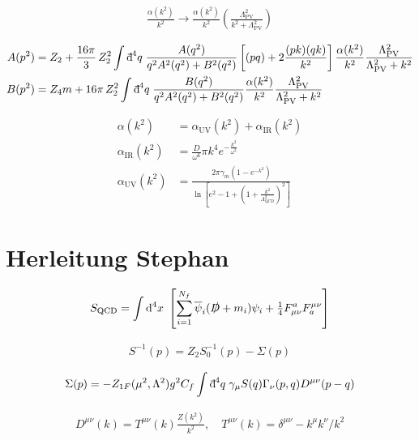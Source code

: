 \documentclass[oneside, openany]{book}
\numberwithin{equation}{chapter}
\numberwithin{figure}{chapter}
\newcommand{\dbar}{\mathord{\mathrm{d}\mkern-8mu\raisebox{0.55em}{\rule{0.38em}{0.05em}}\mkern0.1mu}}
\newcommand{\g}[0]{\gamma}
\begin{document}
\begin{align}
	\frac{\alpha(k^2)}{k^2} \rightarrow \frac{\alpha(k^2)}{k^2} \left(\frac{\Lambda_\mathrm{PV}^2}{k^2 + \Lambda_\mathrm{PV}^2}\right)
\end{align}

\begin{align}
	A(p^2) &= Z_2 + \frac{16\pi}{3}\, Z_2^2 \int \dbar^4 q \; \frac{A(q^2)}{q^2 A^2(q^2) + B^2(q^2)} \left[ (pq) + 2 \frac{(pk)(qk)}{k^2} \right] \frac{\alpha(k^2)}{k^2} \frac{\Lambda_\textrm{PV}^2}{\Lambda_\textrm{PV}^2 + k^2} \\
	B(p^2) &= Z_4m + 16\pi \, Z_2^2 \int \dbar^4 q \; \frac{B(q^2)}{q^2 A^2(q^2) + B^2(q^2)} \frac{\alpha(k^2)}{k^2} \frac{\Lambda_\textrm{PV}^2}{\Lambda_\textrm{PV}^2 + k^2}
\end{align}

\begin{align}
	\alpha(k^2) &= \alpha_\textrm{UV}(k^2) + \alpha_\textrm{IR}(k^2) \\
	\alpha_\textrm{IR}(k^2) &= \frac{D}{\omega^6} \pi k^4 e^{-\tfrac{k^2}{\omega^2}} \\
	\alpha_\textrm{UV}(k^2) &= \frac{2\pi \gamma_m \left(1-e^{-k^2}\right)}{\ln\left[e^2-1+\left(1+\tfrac{k^2}{\Lambda_\mathrm{QCD}^2}\right)^2\right]}
\end{align}

\section{Herleitung Stephan}

\begin{align}
	S_\text{QCD} = \int \dd^4 x\; \left[ \sum^{N_f}_{i=1}\overline\psi_i(\slashed D + m_i)\psi_i + \tfrac{1}{4}F^a_{\mu\nu}F_a^{\mu\nu} \right]
\end{align}


\begin{align}
	S^{-1}(p) = Z_2 S_0^{-1}(p) - \Sigma(p)
\end{align}

\begin{align}
	\Sigma(p) = -Z_{1F}(\mu^2, \Lambda^2)g^2C_f\int \dbar^4q \; \g_\mu S(q)\Gamma_\nu(p,q) D^{\mu\nu}(p-q)
\end{align}

\begin{align}
	D^{\mu\nu}(k) = T^{\mu\nu}(k)\frac{Z(k^2)}{k^2}, \quad T^{\mu\nu}(k) = \delta^{\mu\nu} - k^\mu k^\nu/k^2
\end{align}
\end{document}
